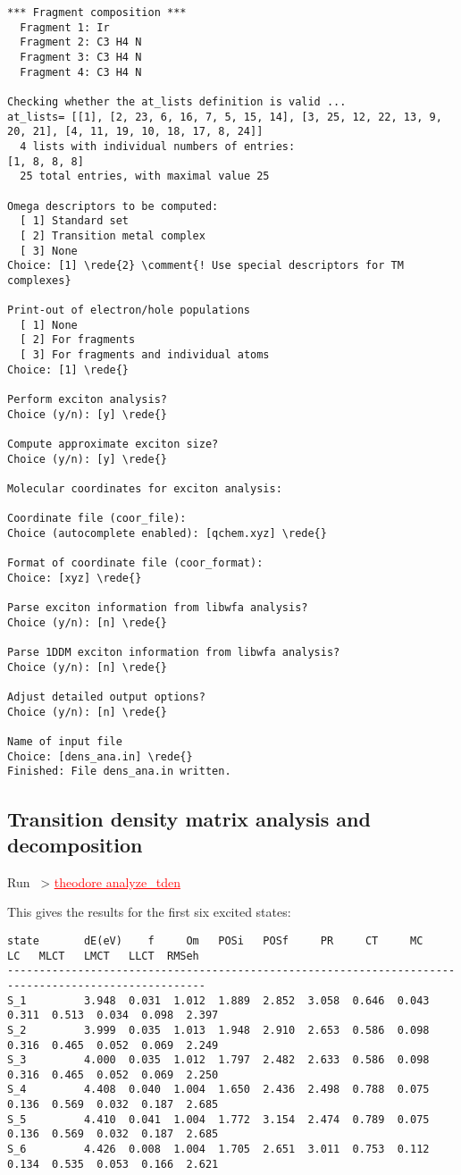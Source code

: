 \documentclass[DIV=12,headings=normal]{scrartcl}
\newcommand{\comment}[1]{\textcolor{blue}{#1}}
\newcommand{\redl}[1]{{\textcolor{red}{\underline{#1}}}}
\newcommand{\rede}[1]{\redl{#1 <ENTER>}}
\newcommand{\comm}[1]{
\small
~> \redl{#1}
\normalsize
}
\newcounter{number}
\begin{document}
\begin{Verbatim}[commandchars=\\\{\}]
*** Fragment composition ***
  Fragment 1: Ir 
  Fragment 2: C3 H4 N 
  Fragment 3: C3 H4 N 
  Fragment 4: C3 H4 N 

Checking whether the at_lists definition is valid ...
at_lists= [[1], [2, 23, 6, 16, 7, 5, 15, 14], [3, 25, 12, 22, 13, 9, 20, 21], [4, 11, 19, 10, 18, 17, 8, 24]]
  4 lists with individual numbers of entries:
[1, 8, 8, 8]
  25 total entries, with maximal value 25

Omega descriptors to be computed:
  [ 1] Standard set
  [ 2] Transition metal complex
  [ 3] None
Choice: [1] \rede{2} \comment{! Use special descriptors for TM complexes} 

Print-out of electron/hole populations
  [ 1] None
  [ 2] For fragments
  [ 3] For fragments and individual atoms
Choice: [1] \rede{}

Perform exciton analysis?
Choice (y/n): [y] \rede{}

Compute approximate exciton size?
Choice (y/n): [y] \rede{}

Molecular coordinates for exciton analysis:

Coordinate file (coor_file):
Choice (autocomplete enabled): [qchem.xyz] \rede{}

Format of coordinate file (coor_format):
Choice: [xyz] \rede{}

Parse exciton information from libwfa analysis?
Choice (y/n): [n] \rede{}

Parse 1DDM exciton information from libwfa analysis?
Choice (y/n): [n] \rede{}

Adjust detailed output options?
Choice (y/n): [n] \rede{}

Name of input file
Choice: [dens_ana.in] \rede{}
Finished: File dens_ana.in written.

\end{Verbatim}
\normalsize

\clearpage
\subsection{Transition density matrix analysis and decomposition}
Run \comm{theodore analyze\_tden}

This gives the results for the first six excited states:
\scriptsize
\begin{Verbatim}[commandchars=\\\{\}]
state       dE(eV)    f     Om   POSi   POSf     PR     CT     MC     LC   MLCT   LMCT   LLCT  RMSeh
-----------------------------------------------------------------------------------------------------
S_1         3.948  0.031  1.012  1.889  2.852  3.058  0.646  0.043  0.311  0.513  0.034  0.098  2.397
S_2         3.999  0.035  1.013  1.948  2.910  2.653  0.586  0.098  0.316  0.465  0.052  0.069  2.249
S_3         4.000  0.035  1.012  1.797  2.482  2.633  0.586  0.098  0.316  0.465  0.052  0.069  2.250
S_4         4.408  0.040  1.004  1.650  2.436  2.498  0.788  0.075  0.136  0.569  0.032  0.187  2.685
S_5         4.410  0.041  1.004  1.772  3.154  2.474  0.789  0.075  0.136  0.569  0.032  0.187  2.685
S_6         4.426  0.008  1.004  1.705  2.651  3.011  0.753  0.112  0.134  0.535  0.053  0.166  2.621
\end{Verbatim}
\normalsize
\end{document}
